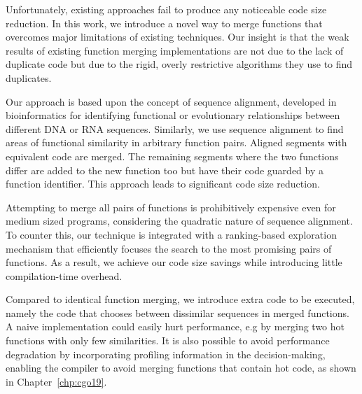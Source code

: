 Unfortunately, existing approaches fail  to produce any noticeable code size reduction.
In this work, we introduce a novel way to merge functions that overcomes major limitations of existing techniques.
Our insight is that the weak results of existing function merging implementations are not due to the lack of duplicate code but due to the rigid, overly restrictive algorithms they use to find duplicates.


Our approach is based upon the concept of sequence alignment, developed in bioinformatics for identifying functional or evolutionary relationships between different DNA or RNA sequences.
Similarly, we use sequence alignment to find areas of functional similarity in arbitrary function pairs.
Aligned segments with equivalent code are merged.
The remaining segments where the two functions differ are added to the new function too but have their code guarded by a function identifier.
This approach leads to significant code size reduction.

Attempting to merge all pairs of functions is prohibitively expensive even for medium sized programs, considering the quadratic nature of sequence alignment.
To counter this, our technique is integrated with a ranking-based exploration mechanism that efficiently focuses the search to the most
promising pairs of functions. %
As a result, we achieve our code size savings while introducing little compilation-time
overhead.

Compared to identical function merging, we introduce extra code to be executed,
namely the code that chooses between dissimilar sequences in merged functions.
A naive implementation could easily hurt performance, e.g by merging two hot functions
with only few similarities. It is also possible to avoid performance degradation by incorporating
profiling information in the decision-making, enabling the compiler to avoid merging functions that contain hot code, as shown in Chapter~\ref{chp:cgo19}.

